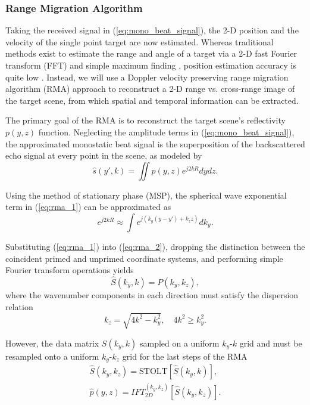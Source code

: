 \documentclass[10pt,journal,final]{IEEEtran}
\begin{document}
\subsubsection{Range Migration Algorithm}
\label{subsubsec:rma}
Taking the received signal in (\ref{eq:mono_beat_signal}), the 2-D position and the velocity of the single point target are now estimated. Whereas traditional methods exist to estimate the range and angle of a target via a 2-D fast Fourier transform (FFT) and simple maximum finding \cite{ti:intro_to_FMCW_radars}, position estimation accuracy is quite low \cite{mimo:joint_range_angle_estimation}. Instead, we will use a Doppler velocity preserving range migration algorithm (RMA) approach to reconstruct a 2-D range vs. cross-range image of the target scene, from which spatial and temporal information can be extracted.

The primary goal of the RMA is to reconstruct the target scene's reflectivity $p(y,z)$ function. Neglecting the amplitude terms in (\ref{eq:mono_beat_signal}), the approximated monostatic beat signal is the superposition of the backscattered echo signal at every point in the scene, as modeled by
\begin{equation}
\label{eq:rma_1}
	\hat{s}(y',k) = \iint p(y,z) e^{j2kR}dydz.
\end{equation}

Using the method of stationary phase (MSP), the spherical wave exponential term in (\ref{eq:rma_1}) can be approximated as
\begin{equation}
\label{eq:rma_2}
	e^{j2kR} \approx \int e^{j( k_y(y-y') + k_z z)} dk_y.
\end{equation}

Substituting (\ref{eq:rma_1}) into (\ref{eq:rma_2}), dropping the distinction between the coincident primed and unprimed coordinate systems, and performing simple Fourier transform operations yields
\begin{equation}
	\hat{S}(k_y,k) = P(k_y,k_z),
\end{equation}
where the wavenumber components in each direction must satisfy the dispersion relation
\begin{equation}
	k_z = \sqrt{4k^2 - k_y^2}, \quad 4k^2 \geq k_y^2.
\end{equation}

However, the data matrix $S(k_y,k)$ sampled on a uniform $k_y$-$k$ grid and must be resampled onto a uniform $k_y$-$k_z$ grid for the last steps of the RMA \cite{rma:stolt}
\begin{gather}
	\hat{S}(k_y,k_z) = \text{STOLT}\left[ \hat{S}(k_y,k) \right], \\
	\hat{p}(y,z) = IFT_{2D}^{(k_y,k_z)}\left[ \hat{S}(k_y,k_z) \right].
\end{gather}
\end{document}
